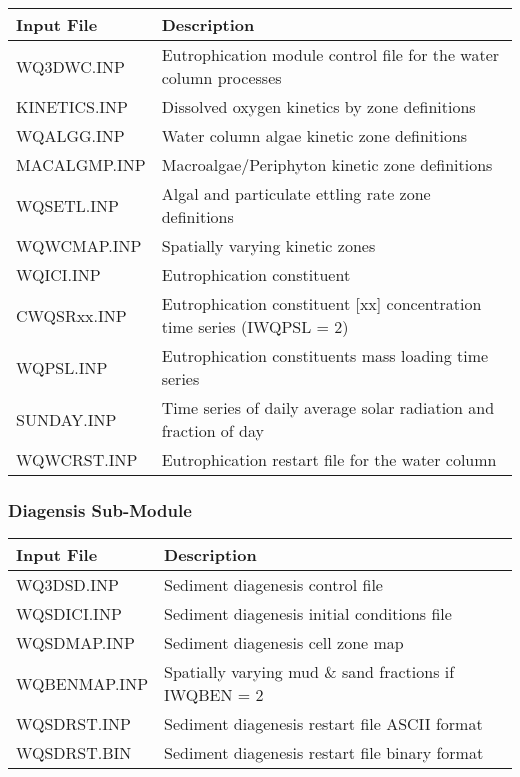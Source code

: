 \documentclass[letterpaper,10pt,english]{sphinxmanual}
\begin{document}
\begin{savenotes}\sphinxattablestart
\centering
\begin{tabulary}{\linewidth}[t]{|T|T|}
\hline
\sphinxstyletheadfamily 
Input File
&\sphinxstyletheadfamily 
Description
\\
\hline
WQ3DWC.INP
&
Eutrophication module control file for the water column processes
\\
\hline
KINETICS.INP
&
Dissolved oxygen kinetics by zone definitions
\\
\hline
WQALGG.INP
&
Water column algae kinetic zone definitions
\\
\hline
MACALGMP.INP
&
Macroalgae/Periphyton kinetic zone definitions
\\
\hline
WQSETL.INP
&
Algal and particulate ettling rate zone definitions
\\
\hline
WQWCMAP.INP
&
Spatially varying kinetic zones
\\
\hline
WQICI.INP
&
Eutrophication constituent
\\
\hline
CWQSRxx.INP
&
Eutrophication constituent {[}xx{]} concentration time series (IWQPSL = 2)
\\
\hline
WQPSL.INP
&
Eutrophication constituents mass loading time series
\\
\hline
SUNDAY.INP
&
Time series of daily average solar radiation and fraction of day
\\
\hline
WQWCRST.INP
&
Eutrophication restart file for the water column
\\
\hline
\end{tabulary}
\par
\sphinxattableend\end{savenotes}


\subsubsection{Diagensis Sub-Module}
\label{\detokenize{inputfiles/eutro:diagensis-sub-module}}

\begin{savenotes}\sphinxattablestart
\centering
\begin{tabulary}{\linewidth}[t]{|T|T|}
\hline
\sphinxstyletheadfamily 
Input File
&\sphinxstyletheadfamily 
Description
\\
\hline
WQ3DSD.INP
&
Sediment diagenesis control file
\\
\hline
WQSDICI.INP
&
Sediment diagenesis initial conditions file
\\
\hline
WQSDMAP.INP
&
Sediment diagenesis cell zone map
\\
\hline
WQBENMAP.INP
&
Spatially varying mud \& sand fractions if IWQBEN = 2
\\
\hline
WQSDRST.INP
&
Sediment diagenesis restart file ASCII format
\\
\hline
WQSDRST.BIN
&
Sediment diagenesis restart file binary format
\\
\hline
\end{tabulary}
\par
\sphinxattableend\end{savenotes}
\end{document}
